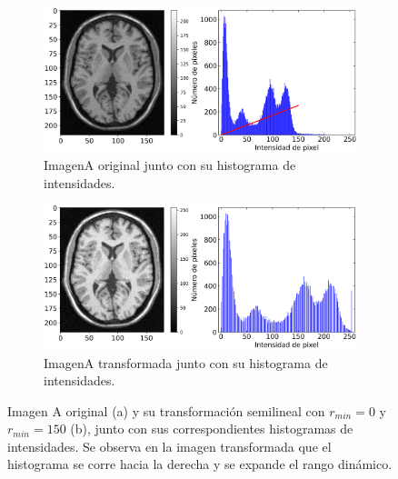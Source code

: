 \documentclass[letterpaper,12pt]{article}
\theoremstyle{plain}
\begin{document}
\begin{figure}[H]
    \centering
         \begin{subfigure}[h]{0.49\linewidth}
            \centering
            \includegraphics[width=\textwidth]{Figuras/ImageA_brute.png}
            \caption{ImagenA original junto con su histograma de intensidades.} 
            \label{fig:semilinear_a}
         \end{subfigure}
         \begin{subfigure}[h]{0.49\linewidth}
            \centering
            \includegraphics[width=\textwidth]{Figuras/ImageA_0_150.png}
            \caption{ImagenA transformada junto con su histograma de intensidades.}
         \end{subfigure}
    \caption{Imagen A original (a) y su transformación semilineal con $r_{min} = 0$ y $r_{min} = 150$ (b), junto con sus correspondientes histogramas de intensidades. Se observa en la imagen transformada que el histograma se corre hacia la derecha y se expande el rango dinámico.}
    \label{fig:Semilineartrans}
\end{figure}
\end{document}
